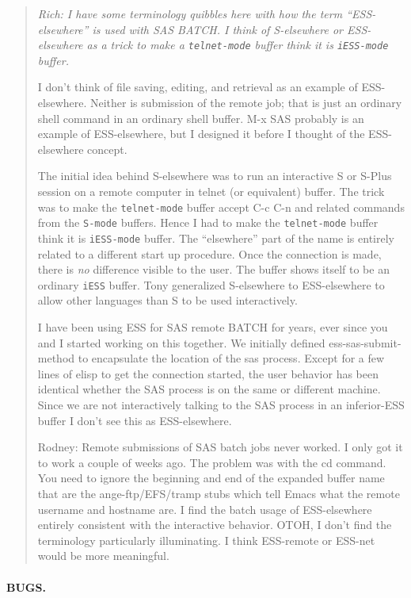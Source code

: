 \documentclass{article}
\newcommand{\stexttt}[1]{{\small\texttt{#1}}}
\newenvironment{Comment}{\begin{quote}\small\itshape }{\end{quote}}
\begin{document}
\begin{Comment}
Rich: I have some terminology quibbles here with how the term
``ESS-elsewhere'' is used with SAS BATCH.  I think of S-elsewhere or
ESS-elsewhere as a trick to make a \stexttt{telnet-mode} buffer think
it is \stexttt{iESS-mode} buffer.

I don't think of file saving, editing, and retrieval as an example
of ESS-elsewhere.   Neither is submission of the remote job;
that is just an ordinary shell command in an ordinary shell buffer.
M-x SAS probably is an example of ESS-elsewhere, but I
designed it before I thought of the ESS-elsewhere concept.

The initial idea behind S-elsewhere was to run an interactive S or S-Plus
session on a remote computer in telnet (or equivalent) buffer.  The trick
was to make the \stexttt{telnet-mode} buffer accept C-c C-n and
related commands from the \stexttt{S-mode} buffers.  Hence I had to
make the \stexttt{telnet-mode} buffer think it is \stexttt{iESS-mode}
buffer.  The ``elsewhere'' part of the name is entirely related to a
different start up procedure.  Once the connection is made, there is
{\em no} difference visible to the user.  The buffer shows itself to
be an ordinary \stexttt{iESS} buffer.  Tony generalized S-elsewhere
to ESS-elsewhere to allow other languages than S to be used
interactively.

I have been using ESS for SAS remote BATCH for years, ever since you
and I started working on this together.  We initially defined
ess-sas-submit-method to encapsulate the location of the sas process.
Except for a few lines of elisp to get the connection started, the user
behavior has been identical whether the SAS process is on the same or
different machine.  Since we are not interactively talking to the SAS
process in an inferior-ESS buffer I don't see this as ESS-elsewhere.

Rodney: Remote submissions of SAS batch jobs never worked.  I only got
it to work a couple of weeks ago.  The problem was with the cd command.
You need to ignore the beginning and end of the expanded buffer name
that are the ange-ftp/EFS/tramp stubs which tell Emacs what the remote
username and hostname are.  I find the batch usage of ESS-elsewhere
entirely consistent with the interactive behavior.  OTOH, I don't find 
the terminology particularly illuminating.  I think ESS-remote or 
ESS-net would be more meaningful. 
\end{Comment}
 
\paragraph{BUGS.}
\label{sec:bugs-batch}
  
\end{document}
